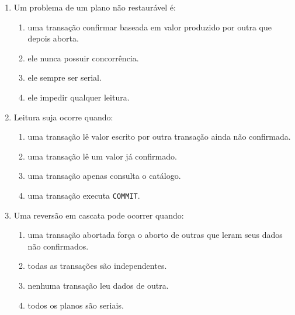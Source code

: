\documentclass[12pt,a4paper]{article}
\begin{document}
\begin{enumerate}[label=\textbf{Q\arabic*.}]
\begin{enumerate}[label=\alph*)]
    \item uma transação só confirma depois das transações das quais leu valores também confirmarem.
    \item toda transação confirma antes de ler.
    \item transações nunca leem dados.
    \item todas as transações são sempre seriais.
\end{enumerate}

\item Um problema de um plano não restaurável é:

\begin{enumerate}[label=\alph*)]
    \item uma transação confirmar baseada em valor produzido por outra que depois aborta.
    \item ele nunca possuir concorrência.
    \item ele sempre ser serial.
    \item ele impedir qualquer leitura.
\end{enumerate}

\item Leitura suja ocorre quando:

\begin{enumerate}[label=\alph*)]
    \item uma transação lê valor escrito por outra transação ainda não confirmada.
    \item uma transação lê um valor já confirmado.
    \item uma transação apenas consulta o catálogo.
    \item uma transação executa \texttt{COMMIT}.
\end{enumerate}

\item Uma reversão em cascata pode ocorrer quando:

\begin{enumerate}[label=\alph*)]
    \item uma transação abortada força o aborto de outras que leram seus dados não confirmados.
    \item todas as transações são independentes.
    \item nenhuma transação leu dados de outra.
    \item todos os planos são seriais.
\end{enumerate}


\end{enumerate}
\end{document}
